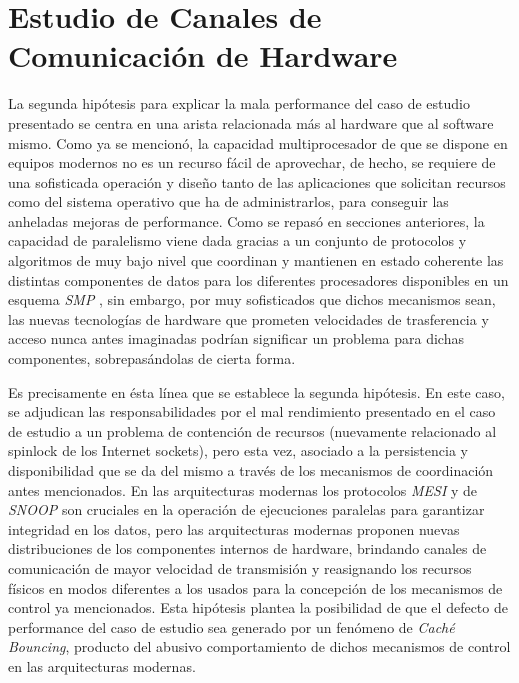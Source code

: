 \chapter{Estudio de Canales de Comunicación de Hardware}
La segunda hipótesis para explicar la mala performance del caso de estudio presentado se centra en una arista relacionada más al hardware que al software mismo. Como ya se mencionó, la capacidad multiprocesador de que se dispone en equipos modernos no es un recurso fácil de aprovechar, de hecho, se requiere de una sofisticada operación y diseño tanto de las aplicaciones que solicitan recursos como del sistema operativo que ha de administrarlos, para conseguir las anheladas mejoras de performance. Como se repasó en secciones anteriores, la capacidad de paralelismo viene dada gracias a un conjunto de protocolos y algoritmos de muy bajo nivel que coordinan y mantienen en estado coherente las distintas componentes de datos para los diferentes procesadores disponibles en un esquema \emph{SMP} \cite{paper:MESI, paper:snoop}, sin embargo, por muy sofisticados que dichos mecanismos sean, las nuevas tecnologías de hardware que prometen velocidades de trasferencia y acceso nunca antes imaginadas podrían significar un problema para dichas componentes, sobrepasándolas de cierta forma.

Es precisamente en ésta línea que se establece la segunda hipótesis. En este caso, se adjudican las responsabilidades por el mal rendimiento presentado en el caso de estudio a un problema de contención de recursos (nuevamente relacionado al spinlock de los Internet sockets), pero esta vez, asociado a la persistencia y disponibilidad que se da del mismo a través de los mecanismos de coordinación antes mencionados. En las arquitecturas modernas los protocolos \emph{MESI} y de \emph{SNOOP} son cruciales en la operación de ejecuciones paralelas para garantizar integridad en los datos, pero las arquitecturas modernas proponen nuevas distribuciones de los componentes internos de hardware, brindando canales de comunicación de mayor velocidad de transmisión y reasignando los recursos físicos en modos diferentes a los usados para la concepción de los mecanismos de control ya mencionados. Esta hipótesis plantea la posibilidad de que el defecto de performance del caso de estudio sea generado por un fenómeno de \emph{Caché Bouncing}, producto del abusivo comportamiento de dichos mecanismos de control en las arquitecturas modernas.


